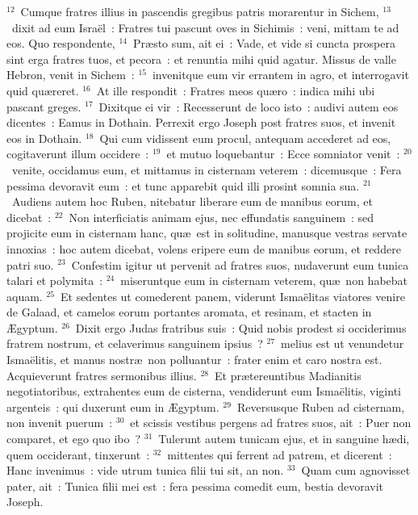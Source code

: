 ${}^{12}$~Cumque fratres illius in pascendis gregibus patris morarentur in Sichem,
${}^{13}$~dixit ad eum Isra\"el~: Fratres tui pascunt oves in Sichimis~: veni, mittam te ad eos. Quo respondente,
${}^{14}$~Pr\ae sto sum, ait ei~: Vade, et vide si cuncta prospera sint erga fratres tuos, et pecora~: et renuntia mihi quid agatur. Missus de valle Hebron, venit in Sichem~:
${}^{15}$~invenitque eum vir errantem in agro, et interrogavit quid qu\ae reret.
${}^{16}$~At ille respondit~: Fratres meos qu\ae ro~: indica mihi ubi pascant greges.
${}^{17}$~Dixitque ei vir~: Recesserunt de loco isto~: audivi autem eos dicentes~: Eamus in Dothain. Perrexit ergo Joseph post fratres suos, et invenit eos in Dothain.
${}^{18}$~Qui cum vidissent eum procul, antequam accederet ad eos, cogitaverunt illum occidere~:
${}^{19}$~et mutuo loquebantur~: Ecce somniator venit~:
${}^{20}$~venite, occidamus eum, et mittamus in cisternam veterem~: dicemusque~: Fera pessima devoravit eum~: et tunc apparebit quid illi prosint somnia sua.
${}^{21}$~Audiens autem hoc Ruben, nitebatur liberare eum de manibus eorum, et dicebat~:
${}^{22}$~Non interficiatis animam ejus, nec effundatis sanguinem~: sed projicite eum in cisternam hanc, qu\ae\ est in solitudine, manusque vestras servate innoxias~: hoc autem dicebat, volens eripere eum de manibus eorum, et reddere patri suo.
${}^{23}$~Confestim igitur ut pervenit ad fratres suos, nudaverunt eum tunica talari et polymita~:
${}^{24}$~miseruntque eum in cisternam veterem, qu\ae\ non habebat aquam.
${}^{25}$~Et sedentes ut comederent panem, viderunt Isma\"elitas viatores venire de Galaad, et camelos eorum portantes aromata, et resinam, et stacten in \AE gyptum.
${}^{26}$~Dixit ergo Judas fratribus suis~: Quid nobis prodest si occiderimus fratrem nostrum, et celaverimus sanguinem ipsius~?
${}^{27}$~melius est ut venundetur Isma\"elitis, et manus nostr\ae\ non polluantur~: frater enim et caro nostra est. Acquieverunt fratres sermonibus illius.
${}^{28}$~Et pr\ae tereuntibus Madianitis negotiatoribus, extrahentes eum de cisterna, vendiderunt eum Isma\"elitis, viginti argenteis~: qui duxerunt eum in \AE gyptum.
${}^{29}$~Reversusque Ruben ad cisternam, non invenit puerum~:
${}^{30}$~et scissis vestibus pergens ad fratres suos, ait~: Puer non comparet, et ego quo ibo~?
${}^{31}$~Tulerunt autem tunicam ejus, et in sanguine h\ae di, quem occiderant, tinxerunt~:
${}^{32}$~mittentes qui ferrent ad patrem, et dicerent~: Hanc invenimus~: vide utrum tunica filii tui sit, an non.
${}^{33}$~Quam cum agnovisset pater, ait~: Tunica filii mei est~: fera pessima comedit eum, bestia devoravit Joseph.

